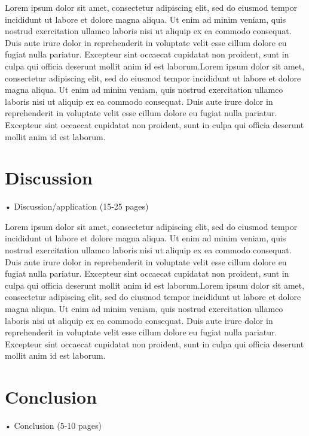 \documentclass[a4paper]{article}
\begin{document}
Lorem ipsum dolor sit amet, consectetur adipiscing elit, sed do eiusmod tempor incididunt ut labore et dolore magna aliqua. Ut enim ad minim veniam, quis nostrud exercitation ullamco laboris nisi ut aliquip ex ea commodo consequat. Duis aute irure dolor in reprehenderit in voluptate velit esse cillum dolore eu fugiat nulla pariatur. Excepteur sint occaecat cupidatat non proident, sunt in culpa qui officia deserunt mollit anim id est laborum.Lorem ipsum dolor sit amet, consectetur adipiscing elit, sed do eiusmod tempor incididunt ut labore et dolore magna aliqua. Ut enim ad minim veniam, quis nostrud exercitation ullamco laboris nisi ut aliquip ex ea commodo consequat. Duis aute irure dolor in reprehenderit in voluptate velit esse cillum dolore eu fugiat nulla pariatur. Excepteur sint occaecat cupidatat non proident, sunt in culpa qui officia deserunt mollit anim id est laborum.


\chapter{Discussion}
• Discussion/application (15-25 pages)


Lorem ipsum dolor sit amet, consectetur adipiscing elit, sed do eiusmod tempor incididunt ut labore et dolore magna aliqua. Ut enim ad minim veniam, quis nostrud exercitation ullamco laboris nisi ut aliquip ex ea commodo consequat. Duis aute irure dolor in reprehenderit in voluptate velit esse cillum dolore eu fugiat nulla pariatur. Excepteur sint occaecat cupidatat non proident, sunt in culpa qui officia deserunt mollit anim id est laborum.Lorem ipsum dolor sit amet, consectetur adipiscing elit, sed do eiusmod tempor incididunt ut labore et dolore magna aliqua. Ut enim ad minim veniam, quis nostrud exercitation ullamco laboris nisi ut aliquip ex ea commodo consequat. Duis aute irure dolor in reprehenderit in voluptate velit esse cillum dolore eu fugiat nulla pariatur. Excepteur sint occaecat cupidatat non proident, sunt in culpa qui officia deserunt mollit anim id est laborum.





\chapter{Conclusion}
• Conclusion (5-10 pages)
\end{document}
